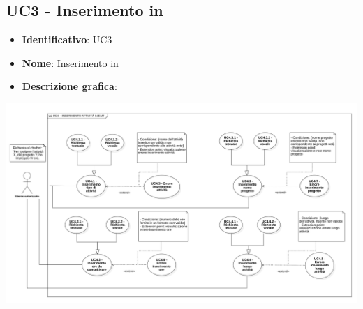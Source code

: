 \subsection{UC3 - Inserimento  in }
\begin{itemize}
    \item \textbf{Identificativo}: UC3 
    \item \textbf{Nome}: Inserimento  in 
    \item \textbf{Descrizione grafica}:
\end{itemize}
\begin{center}
    \includegraphics[scale=0.40]{images/UC3.png} 
\end{center}
